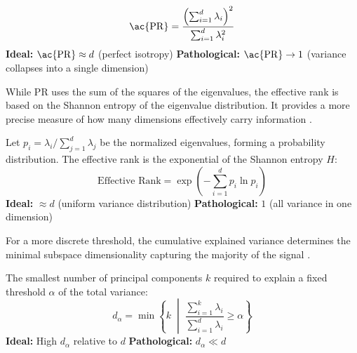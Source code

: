 \begin{metricbox}
\begin{equation}
    \mathrm{\ac{PR}} = \frac{\left(\sum_{i=1}^d \lambda_i\right)^2}{\sum_{i=1}^d \lambda_i^2}
    \label{met:participation_ratio}
\end{equation}
\textbf{Ideal:} $\mathrm{\ac{PR}} \approx d$ (perfect isotropy) \quad \textbf{Pathological:} $\mathrm{\ac{PR}} \to 1$ (variance collapses into a single dimension)
\end{metricbox}


While \ac{PR} uses the sum of the squares of the eigenvalues, the effective rank is based on the Shannon entropy of the eigenvalue distribution. It provides a more precise measure of how many dimensions effectively carry information \cite{roy2007effective}.

\begin{metricbox}
Let $p_i = \lambda_i / \sum_{j=1}^d \lambda_j$ be the normalized eigenvalues, forming a probability distribution. The effective rank is the exponential of the Shannon entropy $H$:
\begin{equation}
    \text{Effective Rank} = \exp\left( -\sum_{i=1}^d p_i \ln p_i \right)
    \label{met:effective_rank}
\end{equation}
\textbf{Ideal:} $\approx d$ (uniform variance distribution) \quad \textbf{Pathological:} $1$ (all variance in one dimension)
\end{metricbox}

For a more discrete threshold, the cumulative explained variance determines the minimal subspace dimensionality capturing the majority of the signal \cite{Gao2017Multineuronal}\cite[p. 325 f.]{deisenroth2020mathematics}. 

\begin{metricbox}
The smallest number of principal components $k$ required to explain a fixed threshold $\alpha$ of the total variance:
\begin{equation}
    d_\alpha = \min \left\{ k \;\middle|\; \frac{\sum_{i=1}^k \lambda_i}{\sum_{i=1}^d \lambda_i} \geq \alpha \right\}
    \label{met:pca_explained_variance}
\end{equation}
\textbf{Ideal:} High $d_\alpha$ relative to $d$ \quad \textbf{Pathological:} $d_\alpha \ll d$
\end{metricbox}


